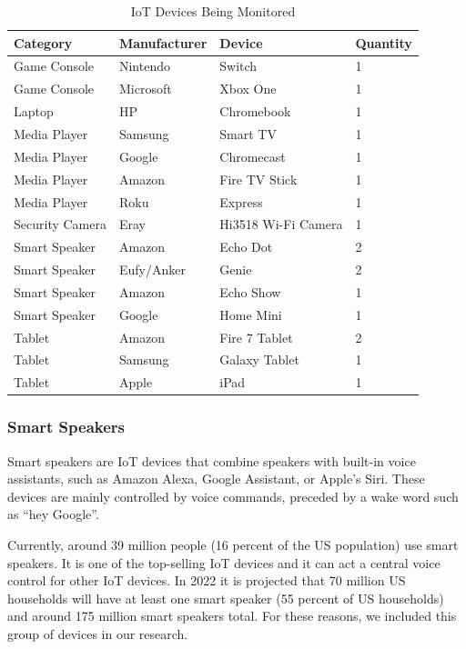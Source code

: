 \begin{table}[H]
    \centering
    \caption{IoT Devices Being Monitored}
    \begin{tabular}{@{}llll@{}}
    \toprule
    Category & Manufacturer & Device        & Quantity \\ \midrule
    Game Console & Nintendo     & Switch        & 1        \\
    Game Console & Microsoft    & Xbox One      & 1        \\
    Laptop & HP           & Chromebook    & 1        \\
    Media Player & Samsung      & Smart TV      & 1        \\
    Media Player & Google       & Chromecast    & 1        \\
    Media Player & Amazon       & Fire TV Stick    & 1        \\
    Media Player & Roku         & Express       & 1        \\
    Security Camera & Eray    & Hi3518 Wi-Fi Camera     & 1        \\
    Smart Speaker & Amazon       & Echo Dot      & 2        \\
    Smart Speaker & Eufy/Anker   & Genie         & 2        \\
    Smart Speaker & Amazon       & Echo Show     & 1        \\
    Smart Speaker & Google       & Home Mini     & 1        \\
    Tablet & Amazon       & Fire 7 Tablet & 2        \\
    Tablet & Samsung      & Galaxy Tablet & 1        \\
    Tablet & Apple        & iPad          & 1        \\ \bottomrule
    \end{tabular}
    \label{tab:devices}
\end{table}

\subsubsection{Smart Speakers}
\label{Smart Speakers}

Smart speakers are IoT devices that combine speakers with built-in voice assistants, such as Amazon Alexa, Google Assistant, or Apple's Siri. These devices are mainly controlled by voice commands, preceded by a wake word such as ``hey Google''.

Currently, around 39 million people (16 percent of the US population) use smart speakers\cite{perez_2017}. It is one of the top-selling IoT devices and it can act a central voice control for other IoT devices. In 2022 it is projected that 70 million US households will have at least one smart speaker (55 percent of US households) and around 175 million smart speakers total\cite{perez_2018}. For these reasons, we included this group of devices in our research.

